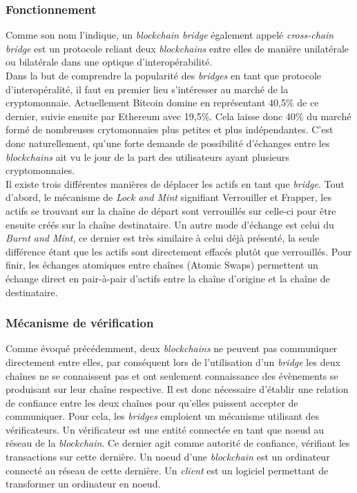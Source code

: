 
\subsubsection{Fonctionnement}

Comme son nom l’indique, un \textit{\gls{blockchain} bridge} également appelé \textit{\gls{cross-chain} bridge} est un protocole reliant deux \textit{\gls{blockchain}s} entre elles de manière unilatérale ou bilatérale dans une optique d’interopérabilité.\\

Dans la but de comprendre la popularité des \textit{bridges} en tant que protocole d’interopéralité, il faut en premier lieu s’intéresser au marché de la cryptomonnaie. Actuellement \gls{Bitcoin} domine en représentant 40,5\% de ce dernier, suivie ensuite par \gls{Ethereum} avec 19,5\%. Cela laisse donc 40\% du marché formé de nombreuses crytomonnaies plus petites et plus indépendantes. C’est donc naturellement, qu’une forte demande de possibilité d’échanges entre les \textit{\gls{blockchain}s} ait vu le jour de la part des utilisateurs ayant plusieurs cryptomonnaies\cite{Ngrave}.\\

Il existe trois différentes manières de déplacer les \gls{actif}s en tant que \textit{bridge}. Tout d’abord, le mécanisme de \textit{Lock and Mint} signifiant Verrouiller et Frapper, les \gls{actif}s se trouvant sur la chaîne de départ sont verrouillés sur celle-ci pour être ensuite créés sur la chaîne destinataire. Un autre mode d'échange est celui du \textit{Burnt and Mint}, ce dernier est très similaire à celui déjà présenté, la seule différence étant que les \gls{actif}s sont directement effacés plutôt que verrouillés. Pour finir, les échanges atomiques entre chaînes (Atomic Swaps) permettent un échange direct en pair-à-pair d'\gls{actif}s entre la chaîne d’origine et la chaîne de destinataire.\cite{EthereumMechanism}

\subsubsection{Mécanisme de vérification}

Comme évoqué précédemment, deux \textit{\gls{blockchain}s} ne peuvent pas communiquer directement entre elles, par conséquent lors de l’utilisation d’un \textit{bridge} les deux chaînes ne se connaissent pas et ont seulement connaissance des évènements se produisant sur leur chaîne respective. Il est donc nécessaire d’établir une relation de confiance entre les deux chaînes pour qu’elles puissent accepter de communiquer. Pour cela, les \textit{bridges} emploient un mécanisme utilisant des \gls{vérificateur}s. Un \gls{vérificateur} est une entité connectée en tant que \gls{noeud} au réseau de la \textit{blockchain}. Ce dernier agit comme autorité de confiance, vérifiant les transactions sur cette dernière. Un noeud d'une \textit{blockchain} est un ordinateur connecté au réseau de cette dernière. Un \textit{client} est un logiciel permettant de transformer un ordinateur en noeud. \cite{EthereumNodeClient} \\


